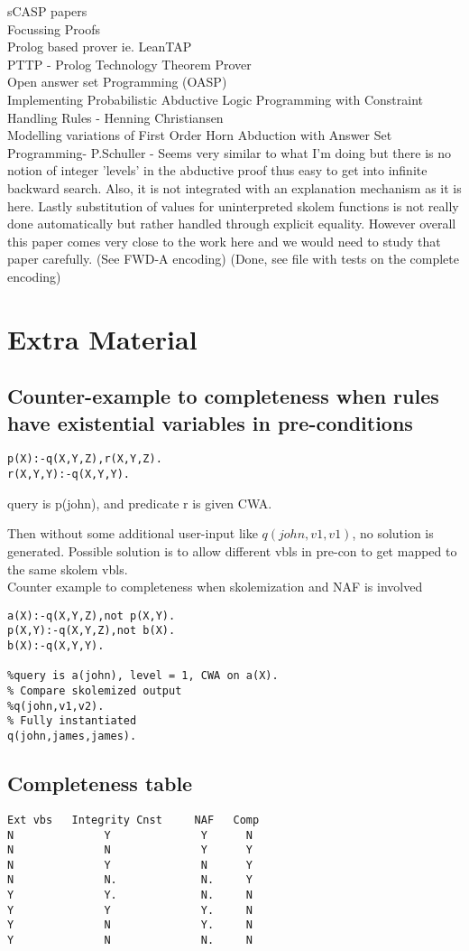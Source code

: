 \documentclass{article}
\begin{document}
sCASP papers\\
Focussing Proofs\\
Prolog based prover ie. LeanTAP\\
PTTP - Prolog Technology Theorem Prover\\
Open answer set Programming (OASP)\\
Implementing
Probabilistic Abductive Logic Programming
with Constraint Handling Rules - Henning Christiansen\\
Modelling variations of First Order Horn Abduction with Answer Set Programming- P.Schuller - Seems very similar to what I'm doing but there is no notion of integer 'levels' in the abductive proof thus easy to get into infinite backward search. Also, it is not integrated with an explanation mechanism as it is here. Lastly substitution of values for uninterpreted skolem functions is not really done automatically but rather handled through explicit equality. However overall this paper comes very close to the work here and we would need to study that paper carefully. (See FWD-A encoding) (Done, see file with tests on the complete encoding)

\section{Extra Material}
\subsection{Counter-example to completeness when rules have existential variables in pre-conditions}
\begin{verbatim}
p(X):-q(X,Y,Z),r(X,Y,Z).
r(X,Y,Y):-q(X,Y,Y).
\end{verbatim}
query is p(john), and predicate r is given CWA. 

Then without some additional user-input like $q(john, v1,v1)$, no solution is generated. Possible solution is to allow different vbls in pre-con to get mapped to the same skolem vbls.\\
\newline
Counter example to completeness when skolemization and NAF is involved
\begin{verbatim}
a(X):-q(X,Y,Z),not p(X,Y).
p(X,Y):-q(X,Y,Z),not b(X).
b(X):-q(X,Y,Y).

%query is a(john), level = 1, CWA on a(X).
% Compare skolemized output
%q(john,v1,v2).
% Fully instantiated
q(john,james,james).    
\end{verbatim}
\subsection{Completeness table}
\begin{verbatim}
Ext vbs   Integrity Cnst     NAF   Comp
N              Y              Y      N
N              N              Y      Y
N              Y              N      Y
N              N.             N.     Y  
Y              Y.             N.     N 
Y              Y              Y.     N
Y              N              Y.     N 
Y              N              N.     N 
\end{verbatim}
\end{document}
